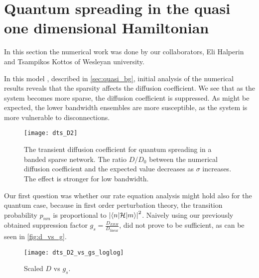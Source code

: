 {\begin{comment}
\notbool{showfigure}{\end{comment}}{}






\section{Quantum spreading in the quasi one dimensional Hamiltonian}

In this section the numerical work was done by our collaborators,
Eli Halperin and Tsampikos Kottos of Wesleyan university.

In this model , described in \autoref{sec:quasi_bg}, initial analysis of
the numerical results reveals that the sparsity affects the diffusion coefficient.
We see that as the system becomes more sparse, the diffusion coefficient is suppressed. 
As might be expected, the lower bandwidth ensembles are more
susceptible, as the system is more vulnerable to disconnections.


\begin{figure}
\texttt{[image: dts\_D2]}
\caption{The transient diffusion coefficient for quantum spreading in
a banded sparse network. The ratio $D/D_0$ between the numerical diffusion 
coefficient and the expected value decreases as $\sigma$ increases. The effect
is stronger for low bandwidth.}
\end{figure}


Our first question was whether our rate equation analysis might
hold also for the quantum case, because in first order perturbation theory,
the transition probability $p_{nm}$ is proportional to $\left|\left\langle n|\mathcal{H} | m \right\rangle\right|^2$.
Naively using our previously obtained suppression factor $g_s = \frac{D_{ERH}}{D_{\textrm{linear}}}$,
did not prove to be sufficient, as can be seen in \autoref{fig:d_vs_g}.

\begin{figure}
\texttt{[image: dts\_D2\_vs\_gs\_loglog]}
\caption{Scaled $D$ vs $g_s$. }\label{fig:d_vs_g}
\end{figure}
